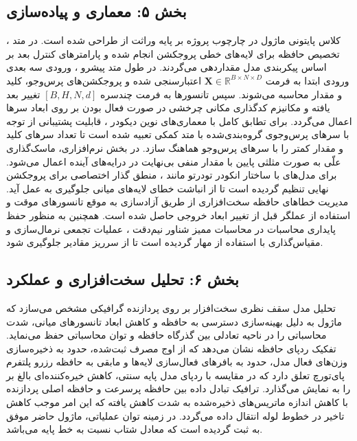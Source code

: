 \subsection*{بخش ۵: معماری و پیاده‌سازی }
کلاس پایتونی ماژول  در چارچوب پروژه بر پایه وراثت از  طراحی شده است. در متد ، تخصیص حافظه برای لایه‌های خطی پروجکشن انجام شده و پارامترهای کنترل بعد بر اساس پیکربندی مدل مقداردهی می‌گردند.
در طول متد پیشرو ، ورودی سه بعدی ورودی ابتدا به فرمت $\mathbf{X} \in \mathbb{R}^{B \times N \times D}$ اعتبارسنجی شده و پروجکشن‌های پرس‌وجو، کلید و مقدار محاسبه می‌شوند. سپس تانسورها به فرمت چندسره $[B, H, N, d]$ تغییر بعد یافته و مکانیزم کدگذاری مکانی چرخشی  در صورت فعال بودن بر روی ابعاد سرها اعمال می‌گردد.
برای تطابق کامل با معماری‌های نوین دیکودر ، قابلیت پشتیبانی از توجه با سرهای پرس‌وجوی گروه‌بندی‌شده  با متد کمکی  تعبیه شده است تا تعداد سرهای کلید و مقدار کمتر را با سرهای پرس‌وجو هماهنگ سازد.
در بخش نرم‌افزاری، ماسک‌گذاری علّی  به صورت مثلثی پایین با مقدار منفی بی‌نهایت در درایه‌های آینده اعمال می‌شود. برای مدل‌های با ساختار انکودر تودرتو  مانند ، منطق گذار اختصاصی برای پروجکشن نهایی تنظیم گردیده است تا از انباشت خطای لایه‌های میانی جلوگیری به عمل آید.
مدیریت خطاهای حافظه سخت‌افزاری  از طریق آزادسازی به موقع تانسورهای موقت و استفاده از عملگر  قبل از تغییر ابعاد خروجی حاصل شده است.
همچنین به منظور حفظ پایداری محاسبات در محاسبات ممیز شناور نیم‌دقت ، عملیات تجمعی نرمال‌سازی و مقیاس‌گذاری با استفاده از  مهار گردیده است تا از سرریز مقادیر جلوگیری شود.

\subsection*{بخش ۶: تحلیل سخت‌افزاری و عملکرد }
تحلیل مدل سقف نظری سخت‌افزار  بر روی پردازنده گرافیکی  مشخص می‌سازد که ماژول  به دلیل بهینه‌سازی دسترسی به حافظه و کاهش ابعاد تانسورهای میانی، شدت محاسباتی  را در ناحیه تعادلی بین گذرگاه حافظه و توان محاسباتی حفظ می‌نماید.
تفکیک ردپای حافظه نشان می‌دهد که از اوج مصرف  ثبت‌شده، حدود  به ذخیره‌سازی وزن‌های فعال مدل، حدود  به بافرهای فعال‌سازی لایه‌ها و مابقی به حافظه رزرو پلتفرم پای‌تورچ تعلق دارد که در مقایسه با ردپای  مدل پایه سنتی، کاهش خیره‌کننده‌ای بالغ بر  را به نمایش می‌گذارد.
ترافیک تبادل داده بین حافظه پرسرعت  و حافظه اصلی  پردازنده با کاهش اندازه ماتریس‌های ذخیره‌شده به شدت کاهش یافته که این امر موجب کاهش تاخیر در خطوط لوله انتقال داده  می‌گردد.
در زمینه توان عملیاتی، ماژول حاضر موفق به ثبت  گردیده است که معادل شتاب  نسبت به خط پایه می‌باشد.

